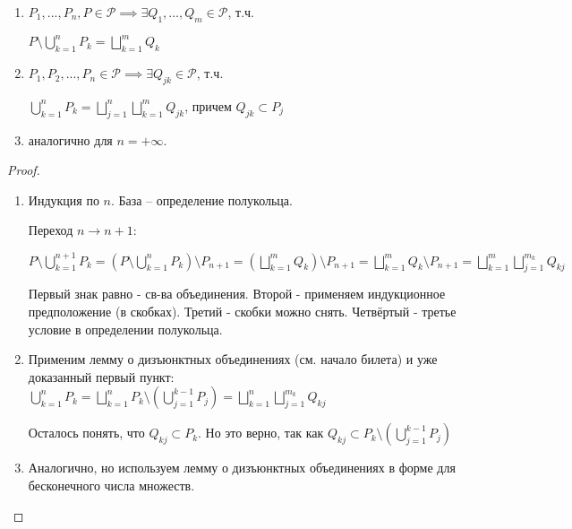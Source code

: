 \begin{theorem}\thmslashn
	
	\begin{enumerate}
		\item $P_1, ...,P_n,P \in \mathcal{P} \implies \exists Q_1,...,Q_m \in \mathcal{P}$, т.ч.
		
		$P\setminus \bigcup\limits_{k=1}^{n} P_k = \bigsqcup\limits_{k=1}^{m} Q_k$
		
		\item $P_1, P_2,...,P_n \in \mathcal{P} \implies \exists Q_{jk} \in \mathcal{P}$, т.ч.
		
		
		$\bigcup\limits_{k=1}^{n} P_k = \bigsqcup\limits_{j=1}^{n}\bigsqcup\limits_{k=1}^{m} Q_{jk}$, причем $Q_{jk} \subset P_j$
		
		\item аналогично для $n = +\infty$.
	\end{enumerate}
\end{theorem}

\begin{proof}\thmslashn
	
	\begin{enumerate}
		\item Индукция по $n$. База -- определение полукольца.
		
		Переход $n \to n+1$:
		
		
		$P\setminus\bigcup\limits_{k=1}^{n+1}P_k = (P \setminus \bigcup\limits_{k=1}^n P_k)\setminus P_{n+1} = (\bigsqcup\limits_{k=1}^m Q_k) \setminus P_{n+1} = \bigsqcup\limits_{k=1}^m Q_k \setminus P_{n+1} = \bigsqcup\limits_{k=1}^m \bigsqcup\limits_{j=1}^{m_k} Q_{kj}$

		Первый знак равно - св-ва объединения. Второй - применяем индукционное предположение (в скобках). Третий - скобки можно снять. Четвёртый - третье условие в определении полукольца.
		
		\item Применим лемму о дизъюнктных объединениях (см. начало билета) и уже доказанный первый пункт:
		$\bigcup\limits_{k=1}^n P_k = \bigsqcup\limits_{k=1}^n P_k \setminus(\bigcup\limits_{j=1}^{k-1}P_j) = \bigsqcup\limits_{k=1}^n \bigsqcup\limits_{j=1}^{m_k} Q_{kj}$
		
		
		Осталось понять, что $Q_{kj} \subset P_k$. Но это верно, так как $Q_{kj} \subset P_k \setminus(\bigcup\limits_{j=1}^{k-1}P_j)$ 

		\item Аналогично, но используем лемму о дизъюнктных объединениях в форме для бесконечного числа множеств.
	\end{enumerate}
\end{proof}


